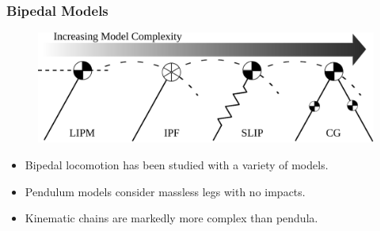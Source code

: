 \documentclass{beamer}
\begin{document}
\begin{frame}
  \frametitle{Bipedal Models}
  \begin{figure}
    \centering
    \includegraphics[width=.9\textwidth]{biped-models}
  \end{figure}
  \begin{itemize}
    \item Bipedal locomotion has been studied with a variety of models.
    \item Pendulum models consider massless legs with no impacts.
    \item Kinematic chains are markedly more complex than pendula.
  \end{itemize}
\end{frame}
\end{document}
